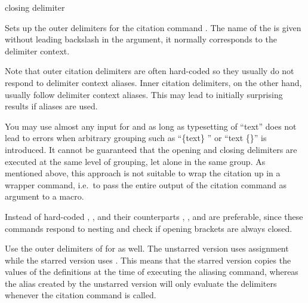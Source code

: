 \documentclass[DIV=9]{scrartcl}
\begin{document}
\begin{ltxsyntax}
        {closing delimiter}

Sets up the outer delimiters for the citation command
. The name of the 
is given without leading backslash in the argument, it normally corresponds to
the delimiter context.

Note that outer citation delimiters are often hard-coded so they usually do not
respond to delimiter context aliases.
Inner citation delimiters, on the other hand, usually follow delimiter context
aliases.
This may lead to initially surprising results if aliases are used.

You may use almost any input for  and
 as long as typesetting of
\enquote{text} does not lead to
errors when arbitrary grouping such as
\enquote{\{\allowbreak text\}\allowbreak
{}}
or \enquote{\allowbreak text\allowbreak
\{\}}
is introduced.
It cannot be guaranteed that the opening and closing delimiters are executed
at the same level of grouping, let alone in the same group.
As mentioned above, this approach is not suitable to wrap the citation up in a
wrapper command, i.e.\ to pass the entire output of the citation command as
argument to a macro.

Instead of hard-coded \gencode{(}, \gencode{)}, \gencode{[} and \gencode{]}
their  counterparts , ,
 and  are preferable, since these
commands respond to nesting and check if opening brackets are always closed.


Use the outer delimiters of  for
 as well.
The unstarred version uses  assignment while the starred version uses
. This means that the starred version copies the values of the
definitions at the time of executing the aliasing command,
whereas the alias created by the unstarred version will only evaluate the
delimiters whenever the citation command is called.



\end{ltxsyntax}
\end{document}
